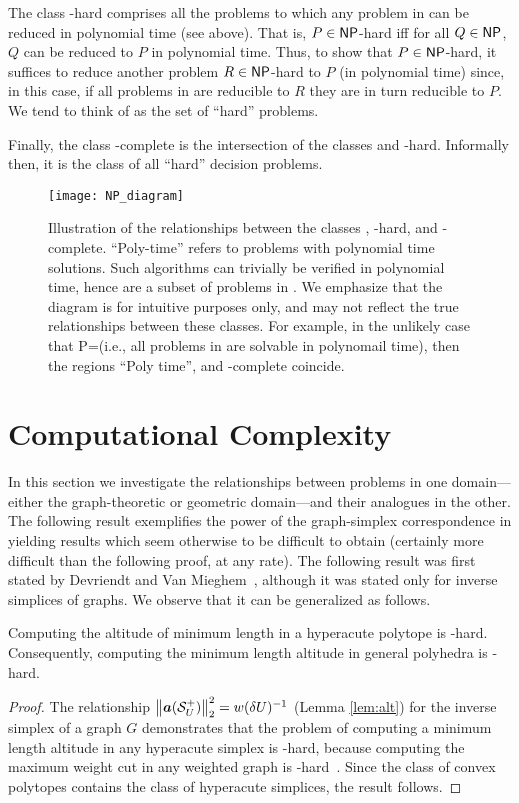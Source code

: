 The class \NP-hard comprises all the problems to  which  any problem in \NP can be reduced in polynomial time (see above). That is, $P\in{\normalfont\textsf{NP}}$-hard iff for all  $Q\in{\normalfont\textsf{NP}}$,  $Q$ can be  reduced to $P$ in polynomial time. Thus,  to show that $P\in{\normalfont\textsf{NP}}$-hard, it suffices to reduce another problem $R\in{\normalfont\textsf{NP}}$-hard to  $P$ (in polynomial time) since,  in this  case, if all problems in \NP are  reducible  to  $R$  they are in turn  reducible  to  $P$. We  tend to think of \NP as the set of ``hard'' problems. 

Finally,  the class \NP-complete is the intersection of the classes \NP and  \NP-hard. Informally then, it is  the  class of all ``hard'' decision problems. 

\begin{figure}
	\centering
	\texttt{[image: NP\_diagram]}
	\caption{Illustration of the relationships between the  classes \NP,  \NP-hard, and \NP-complete. ``Poly-time'' refers to problems with polynomial time solutions. Such algorithms can trivially be verified  in polynomial time, hence  are a  subset of problems in \NP. We emphasize that the diagram is  for intuitive purposes only,  and may not reflect the true relationships between these classes. For example, in  the unlikely  case that \textsf{P}=\NP (i.e., all problems in  \NP are solvable in polynomail time), then the regions ``Poly time'', \NP and \NP-complete coincide.}
\end{figure}



\section{Computational Complexity}
\label{sec:algorithmics_complexity}

In this section we investigate the relationships between problems in one domain---either the graph-theoretic or geometric domain---and their analogues in the other. The following result exemplifies the power of the graph-simplex correspondence in yielding results which seem otherwise to be difficult to obtain (certainly more difficult than the following proof, at any rate).  
The following result was first stated by Devriendt and Van Mieghem~\cite{devriendt2018simplex}, although it was stated only for inverse simplices of graphs. We observe that it can be generalized as follows. 

\begin{lemma}
	\label{lem:altitude_hard}
	Computing the altitude of minimum length in a hyperacute polytope is \NP-hard. Consequently, computing the minimum length altitude in general polyhedra is \NP-hard. 
\end{lemma}
\begin{proof}
	The relationship $\norm{\vb*{a}(\mathcal{S}^+_U)}_2^2 = w(\delta U)^{-1}$ (Lemma \ref{lem:alt}) for the inverse simplex of a graph $G$ demonstrates that the problem of computing a minimum length altitude in any hyperacute simplex is \NP-hard, because computing the  maximum weight cut in any weighted graph is \NP-hard~\cite{karp1972reducibility}.  Since the class of convex polytopes contains the class of hyperacute simplices, the result follows. 
\end{proof}

